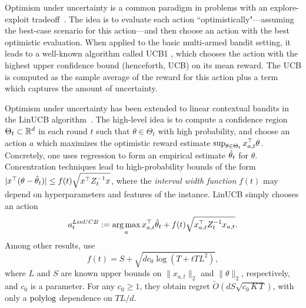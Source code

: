   Optimism under uncertainty is a
common paradigm in problems with an explore-exploit
tradeoff~\citep{Bubeck-survey12}. The idea is to evaluate each action
``optimistically"---assuming the best-case scenario for this
action---and then choose an action with the best optimistic
evaluation. When applied to the basic multi-armed bandit setting, it
leads to a well-known algorithm called UCB1 \citep{bandits-ucb1},
which chooses the action with the highest upper confidence bound (henceforth,
UCB) on its mean reward. The UCB is computed as the sample average of
the reward for this action plus a term which captures the amount of
uncertainty.

Optimism under uncertainty has been extended to linear contextual
bandits in the LinUCB
algorithm~\citep{chu2011contextual,abbasi2011improved}. The high-level
idea is to compute a confidence region
$\Theta_t \subset \mathbb{R}^d$ in each round $t$ such that $\theta\in \Theta_t$ with high
probability, and choose an action $a$ which maximizes the optimistic
reward estimate $\sup_{\theta \in \Theta_t} x_{a,t}^{\top} \theta$.
Concretely, one uses regression to form an empirical estimate
$\hat{\theta}_t$ for $\theta$.  Concentration techniques lead to
high-probability bounds of the form
$|x^{\top} (\theta -\hat{\theta}_t)| \leq f(t) \sqrt{x^{\top} Z_t^{-1}x}$, where
the \emph{interval width function} $f(t)$ may depend on hyperparameters and features of
the instance. LinUCB simply chooses an action
\begin{equation}
  a_t^{LinUCB} := \operatorname*{arg\,max}_a x_{a,t}^{\top} \hat{\theta}_t + f(t) \sqrt{x_{a,t}^{\top} Z_t^{-1}
  x_{a,t}}.
  \label{eq:linucb_def}
\end{equation}
Among other results, \citet{abbasi2011improved} use
\begin{equation}
  f(t) = S+\sqrt{d c_0\log (T+tTL^2)},
  \label{eq:Abbasi-f}
\end{equation}
where $L$ and $S$ are known upper bounds on $\|x_{a,t}\|_2$ and $\|\theta\|_2$, respectively, and $c_0$ is a parameter. For any $c_0\geq 1$, they obtain regret
    $\tilde{O}(dS\sqrt{c_0\, K\,T})$,
with only a $\polylog$ dependence on $TL/d$.
